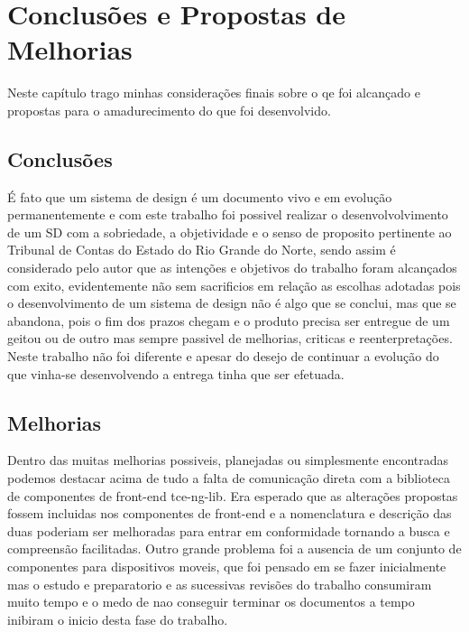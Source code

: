\chapter[Capítulo 5]{Conclusões e Propostas de Melhorias}
\label{ch:cap5}

  Neste capítulo trago minhas considerações finais sobre o qe foi alcançado e propostas para o amadurecimento do que foi desenvolvido.

\section{Conclusões}\label{cap5:conclusao}

  É fato que um sistema de design é um documento vivo e em evolução permanentemente e com este trabalho foi possivel realizar o desenvolvolvimento de um SD com a sobriedade, a objetividade e o senso de proposito pertinente ao Tribunal de Contas do Estado do Rio Grande do Norte, sendo assim é considerado pelo autor que as intenções e objetivos do trabalho foram alcançados com exito, evidentemente não sem sacrificios em relação as escolhas adotadas pois o desenvolvimento de um sistema de design não é algo que se conclui, mas que se abandona, pois o fim dos prazos chegam e o produto precisa ser entregue de um geitou ou de outro mas sempre passivel de melhorias, criticas e reenterpretações. Neste trabalho não foi diferente e apesar do desejo de continuar a evolução do que vinha-se desenvolvendo a entrega tinha que ser efetuada.

\section{Melhorias}\label{cap5:melhorias}

  Dentro das muitas melhorias possiveis, planejadas ou simplesmente encontradas podemos destacar acima de tudo a falta de comunicação direta com a biblioteca de componentes de front-end tce-ng-lib. Era esperado que as alterações propostas fossem incluidas nos componentes de front-end e a nomenclatura e descrição das duas poderiam ser melhoradas para entrar em conformidade tornando a busca e compreensão facilitadas. Outro grande problema foi a ausencia de um conjunto de componentes para dispositivos moveis, que foi pensado em se fazer inicialmente mas o estudo e preparatorio e as sucessivas revisões do trabalho consumiram muito tempo e o medo de nao conseguir terminar os documentos a tempo inibiram o inicio desta fase do trabalho.

